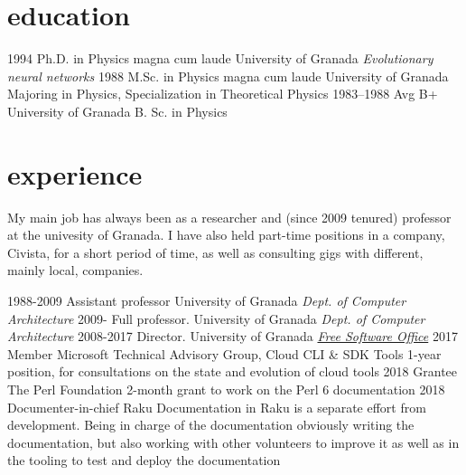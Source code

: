 \documentclass[]{friggeri-jj-cv}
\begin{document}
\section{education}

\begin{entrylist}
  \entry
    {1994}
    {Ph.D. {\normalfont in Physics} magna cum laude}
    {University of Granada}
    {\emph{Evolutionary neural networks}}
  \entry
    {1988}
    {M.Sc. {\normalfont in Physics} magna cum laude}
    {University of Granada}
    {Majoring in Physics, Specialization in Theoretical Physics}
  \entry
    {1983–1988}
    {Avg B+}
    {University of Granada}
    {B. Sc. in Physics}
\end{entrylist}

\section{experience}

My main job has always been as a researcher and (since 2009 tenured)
professor at the univesity of Granada. I have also held part-time
positions in a company, Civista, for a short period of time, as well
as consulting gigs with different, mainly local, companies.

\begin{entrylist}
  \entry
    {1988-2009}
    {Assistant professor}
    {University of Granada}
    {\emph{Dept. of Computer Architecture}}
  \entry
    {2009-}
    {Full professor.}
    {University of Granada}
    {\emph{Dept. of Computer Architecture}}
    \entry
    {2008-2017}
    {Director.}
    {University of Granada}
    {\href{http://osl.ugr.es}{\emph{Free Software Office}}}
    \entry
    {2017}
    {Member}
    {Microsoft Technical Advisory Group, Cloud CLI \& SDK Tools}
    {1-year position, for consultations on the state and evolution of
      cloud tools}
    \entry
    {2018}
    {Grantee}
    {The Perl Foundation}
    {2-month grant to work on the Perl 6 documentation}
    \entry
    {2018}
    {Documenter-in-chief}
    {Raku}
    {Documentation in Raku is a separate effort from
      development. Being in charge of the documentation obviously
      writing the documentation, but also working with other
      volunteers to improve it as well as in the tooling to test and
      deploy the documentation}
\end{entrylist}

\newpage
\end{document}
